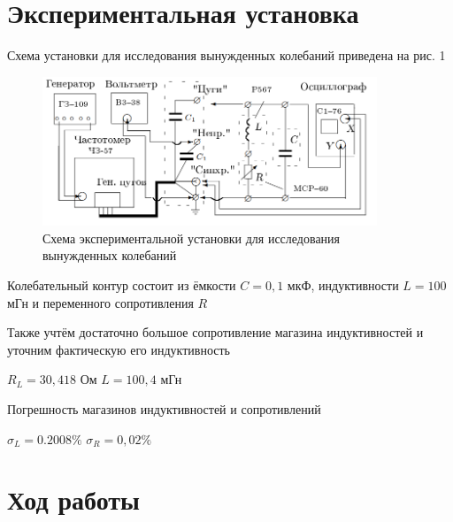 \documentclass[a4paper]{article}
\begin{document}
\section{Экспериментальная установка}
Схема установки для исследования вынужденных колебаний приведена на рис. 1
\begin{figure}[h]
    \centering
    \includegraphics[width=10cm]{fig1.PNG}
    \caption{Схема экспериментальной установки для исследования вынужденных колебаний}
    \label{fig:vac}
\end{figure}

Колебательный контур состоит из ёмкости $C = 0,1$ мкФ, индуктивности $L = 100$  мГн и переменного сопротивления $R$ \par
Также учтём достаточно большое сопротивление магазина индуктивностей и уточним фактическую его индуктивность
\begin{center}
    $R_L = 30,418$ Ом \hspace{1cm} $L = 100,4$ мГн
\end{center}

Погрешность магазинов индуктивностей и сопротивлений
\begin{center}
    $\sigma_L = 0.2008\%$ \hspace{1cm} $\sigma_R = 0,02\%$
\end{center}

\section{Ход работы}
\end{document}
